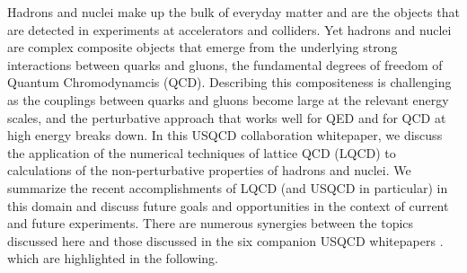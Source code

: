 Hadrons and nuclei make up the bulk of everyday matter and are the objects that are detected in experiments at accelerators and colliders. Yet hadrons and nuclei are complex composite objects that emerge from the underlying strong interactions between quarks and gluons, the fundamental degrees of freedom of Quantum Chromodynamcis (QCD). Describing this compositeness is challenging as the couplings between quarks and gluons become large at the relevant energy scales, and the perturbative approach that works well for QED and for QCD at high energy breaks down.
%
In this USQCD collaboration whitepaper, we discuss the application of the numerical techniques of lattice QCD (LQCD) to calculations of the non-perturbative properties of hadrons and nuclei. We summarize the  recent accomplishments of LQCD (and USQCD in particular) in this domain and discuss future goals and opportunities in the context of current and future experiments. There  are numerous synergies between the topics discussed here and those discussed in the six companion USQCD whitepapers
\cite{Bazavov:2019lgz,Brower:2019oor,Cirigliano:2019jig,Joo:2019byq,Kronfeld:2019nfb,Lehner:2019wvv}.
which are highlighted in the following.

